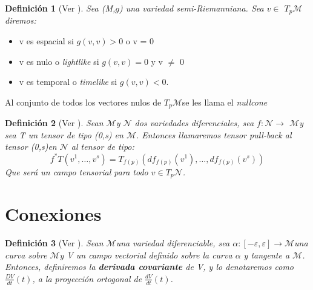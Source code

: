 \documentclass[pdftex,11pt,a4paper]{book}
\newtheorem{defi}{Definici\'on}
\newcommand{\M}{$\mathscr{M}$}
\newcommand{\tpm}{$T_p\mathscr{M}$}
\begin{document}
\begin{defi}[Ver \cite{boothby}]
Sea (M,$g$) una variedad semi-Riemanniana. Sea $v\in$ \tpm diremos: 
\end{defi}
\begin{itemize}
    \item v es espacial si $g(v,v)>0$ o v = 0
    \item v es nulo o \textit{lightlike} si $g(v,v)= 0$ y v $\neq$ 0
    \item v es temporal o\textit{ timelike } si $g(v,v)<0$. 
\end{itemize}
Al conjunto de todos los vectores nulos de \tpm se les llama el \textit{nullcone}


\begin{defi}[Ver \cite{boothby}]
Sean \M y  $\mathscr{N}$ dos variedades diferenciales, sea $f:\mathscr{N} \to$ \M y
 sea T un tensor de tipo (0,s) en \M. Entonces llamaremos tensor \textit{pull-back} al tensor (0,s)en $\mathscr{N}$ al tensor de tipo: 
\begin{equation}
    f^*T(v^1,\ldots, v^s)= T_{f(p)} (df_{f(p)}(v^1), \ldots, df_{f(p)} (v^s))
\end{equation}
Que será un campo tensorial para todo $v\in T_p\mathscr{N} $.
\end{defi}

\section{Conexiones}
\begin{defi}[Ver \cite{DoCarmoRiemann}]
Sean \M una variedad diferenciable, sea $\alpha:[-\varepsilon,\varepsilon]\to $\M una curva sobre \M  y V un campo vectorial definido sobre la curva $\alpha$ y tangente a \M . Entonces, definiremos la \textbf{derivada covariante} de V, y lo denotaremos como $\frac{DV}{dt}(t)$, a la proyección ortogonal de $\frac{dV}{dt}(t)$.
\end{defi}
\end{document}
